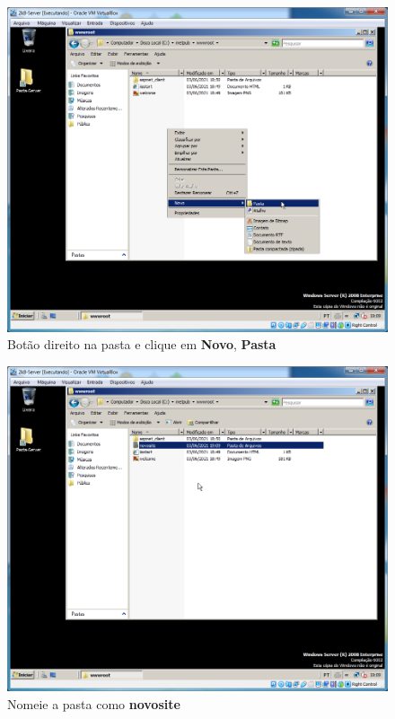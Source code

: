\documentclass[10pt]{article}
\begin{document}
\begin{figure}[H]
    \centering
    \caption{Botão direito na pasta e clique em \textbf{Novo}, \textbf{Pasta}}
    \label{fig:5532026}
    \includegraphics[width=\linewidth]{images/IIS/criando_um_novo_site/026.png}
\end{figure}
\begin{figure}[H]
    \centering
    \caption{Nomeie a pasta como \textbf{novosite}}
    \label{fig:5532027}
    \includegraphics[width=\linewidth]{images/IIS/criando_um_novo_site/027.png}
\end{figure}
\end{document}
